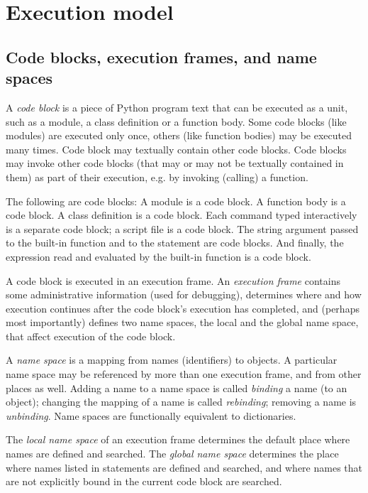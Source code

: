 \chapter{Execution model}

\section{Code blocks, execution frames, and name spaces} \label{execframes}

A {\em code block} is a piece of Python program text that can be
executed as a unit, such as a module, a class definition or a function
body.  Some code blocks (like modules) are executed only once, others
(like function bodies) may be executed many times.  Code block may
textually contain other code blocks.  Code blocks may invoke other
code blocks (that may or may not be textually contained in them) as
part of their execution, e.g. by invoking (calling) a function.

The following are code blocks:  A module is a code block.  A function
body is a code block.  A class definition is a code block.  Each
command typed interactively is a separate code block; a script file is
a code block.  The string argument passed to the built-in function
\verb@eval@ and to the \verb@exec@ statement are code blocks.
And finally, the
expression read and evaluated by the built-in function \verb@input@ is
a code block.

A code block is executed in an execution frame.  An {\em execution
frame} contains some administrative information (used for debugging),
determines where and how execution continues after the code block's
execution has completed, and (perhaps most importantly) defines two
name spaces, the local and the global name space, that affect
execution of the code block.

A {\em name space} is a mapping from names (identifiers) to objects.
A particular name space may be referenced by more than one execution
frame, and from other places as well.  Adding a name to a name space
is called {\em binding} a name (to an object); changing the mapping of
a name is called {\em rebinding}; removing a name is {\em unbinding}.
Name spaces are functionally equivalent to dictionaries.

The {\em local name space} of an execution frame determines the default
place where names are defined and searched.  The {\em global name
space} determines the place where names listed in \verb@global@
statements are defined and searched, and where names that are not
explicitly bound in the current code block are searched.

